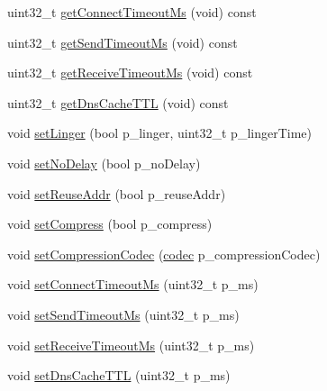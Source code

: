 \begin{DoxyCompactItemize}
\item 
uint32\-\_\-t \hyperlink{classxtd_1_1network_1_1utils_1_1Config_a2dfd5c85238ef930891d3696e6f6246c}{get\-Connect\-Timeout\-Ms} (void) const 
\item 
uint32\-\_\-t \hyperlink{classxtd_1_1network_1_1utils_1_1Config_a300d76106dcc338d662894dd04373d91}{get\-Send\-Timeout\-Ms} (void) const 
\item 
uint32\-\_\-t \hyperlink{classxtd_1_1network_1_1utils_1_1Config_a4484d8887f26682beb5aaa45f801dc57}{get\-Receive\-Timeout\-Ms} (void) const 
\item 
uint32\-\_\-t \hyperlink{classxtd_1_1network_1_1utils_1_1Config_a1ef6d7fcee95df86143dfbdd007f64f9}{get\-Dns\-Cache\-T\-T\-L} (void) const 
\item 
void \hyperlink{classxtd_1_1network_1_1utils_1_1Config_a1a0e52354981c89c5aaf2b31d4490de2}{set\-Linger} (bool p\-\_\-linger, uint32\-\_\-t p\-\_\-linger\-Time)
\item 
void \hyperlink{classxtd_1_1network_1_1utils_1_1Config_a1dbcee3c0f2631269ea3e716a62ce333}{set\-No\-Delay} (bool p\-\_\-no\-Delay)
\item 
void \hyperlink{classxtd_1_1network_1_1utils_1_1Config_a5e78cf9920484c88da5f42bae16b7a1f}{set\-Reuse\-Addr} (bool p\-\_\-reuse\-Addr)
\item 
void \hyperlink{classxtd_1_1network_1_1utils_1_1Config_aab76e2174465ead19cc97fa3f5a7f009}{set\-Compress} (bool p\-\_\-compress)
\item 
void \hyperlink{classxtd_1_1network_1_1utils_1_1Config_a604e4ade1c49d83d204024f28a3d461d}{set\-Compression\-Codec} (\hyperlink{namespacextd_1_1network_1_1utils_a3ac1216ad2037b366cc1f9051a978161}{codec} p\-\_\-compression\-Codec)
\item 
void \hyperlink{classxtd_1_1network_1_1utils_1_1Config_a5ecd1cd77dd3bd937aa021d3bf0ad860}{set\-Connect\-Timeout\-Ms} (uint32\-\_\-t p\-\_\-ms)
\item 
void \hyperlink{classxtd_1_1network_1_1utils_1_1Config_a583358bf6945cbddd657f6db8c31618e}{set\-Send\-Timeout\-Ms} (uint32\-\_\-t p\-\_\-ms)
\item 
void \hyperlink{classxtd_1_1network_1_1utils_1_1Config_ad633fb35c7202550d444e4bf5ae213df}{set\-Receive\-Timeout\-Ms} (uint32\-\_\-t p\-\_\-ms)
\item 
void \hyperlink{classxtd_1_1network_1_1utils_1_1Config_a9a2d3e9de6f26708a4bddc4ba7c31428}{set\-Dns\-Cache\-T\-T\-L} (uint32\-\_\-t p\-\_\-ms)
\end{DoxyCompactItemize}


